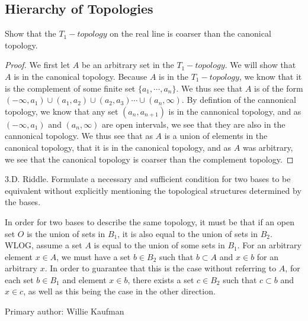 \subsection{Hierarchy of Topologies}
\begin{minorEx}%
  Show that the $T_1-topology$ on the real line is coarser than the canonical topology.
\end{minorEx}
\begin{proof}
  We first let $A$ be an arbitrary set in the $T_1-topology$. We will show that $A$ is in the canonical topology. Because $A$ is in the $T_1-topology$, we know that it is the complement of some finite set $\{a_1,\cdots,a_n\}$. We thus see that $A$ is of the form $(-\infty,a_1)\cup (a_1,a_2) \cup (a_2,a_3) \cdots \cup (a_n,\infty)$. By defintion of the cannonical topology, we know that any set $(a_n,a_{n+1})$ is in the cannonical topology, and as $(-\infty,a_1)$ and $ (a_n,\infty)$ are open intervals, we see that they are also in the cannonical topology. We thus see that as $A$ is a union of elements in the canonical topology, that it is in the canonical topology, and as $A$ was arbitrary, we see that the canonical topology is coarser than the complement topology.
\end{proof}

\begin{majorEx}
3.D. Riddle. Formulate a necessary and sufficient condition for two bases
to be equivalent without explicitly mentioning the topological structures
determined by the bases.
\end{majorEx}
In order for two bases to describe the same topology, it must be that if an open set $O$ is the union of sets in $B_1$, it is also equal to the union of sets in $B_2$. WLOG, assume a set $A$ is equal to the union of some sets in $B_1$. For an arbitrary element $x \in A$, we must have a set $b \in B_2$ such that $b \subset A$ and $x \in b$ for an arbitrary $x$. In order to guarantee that this is the case without referring to $A$, for each set $b \in B_1$ and element $x \in b$, there exists a set $c \in B_2$ such that $c \subset b$ and $x \in c$, as well as this being the case in the other direction.

Primary author: Willie Kaufman
